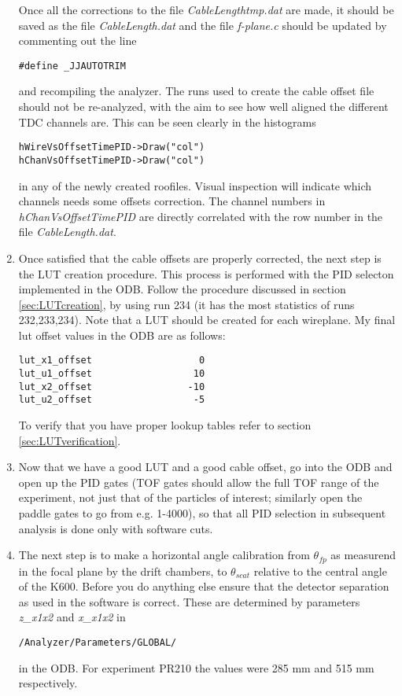 \documentclass[11pt]{report}
\begin{document}
\begin{enumerate}
Once all the corrections to the file {\it CableLengthtmp.dat}
are made, it should be saved as the file {\it CableLength.dat} and the file
{\it f-plane.c} should be updated by commenting out the line
\begin{verbatim} 
#define _JJAUTOTRIM
\end{verbatim}
and recompiling the analyzer. The runs used to create the cable offset file
should not be re-analyzed, with the aim to see how well aligned the different
TDC channels are. This can be seen clearly in the histograms
\begin{verbatim} 
hWireVsOffsetTimePID->Draw("col")
hChanVsOffsetTimePID->Draw("col")
\end{verbatim}
in any of the newly created roofiles. Visual inspection will indicate which channels
needs some offsets correction. The channel numbers in {\it hChanVsOffsetTimePID}
are directly correlated with the row number in the file  {\it CableLength.dat}.

\item 
Once satisfied that the cable offsets are properly corrected, the next
step is the LUT creation procedure. This process is performed with the
PID selecton implemented in the ODB. 
Follow the procedure discussed in section \ref{sec:LUTcreation},
by using run 234 (it has the most statistics of runs 232,233,234).
Note that a LUT should be created for each wireplane.
My final lut offset values in the ODB are as follows:
\begin{verbatim}
lut_x1_offset                   0
lut_u1_offset                  10
lut_x2_offset                 -10
lut_u2_offset                  -5
\end{verbatim}
To verify that you have proper lookup tables refer to section \ref{sec:LUTverification}.

\item 
Now that we have a good LUT and a good cable offset, go into the ODB and
open up the PID gates (TOF gates should allow the full TOF range of the experiment, not just that of 
the particles of interest; similarly open the paddle gates to go from e.g. 1-4000), 
so that all PID selection in subsequent analysis is done only with software cuts.

\item The next step is to make a horizontal angle calibration from $\theta_{fp}$
as measurend in the focal plane by the drift chambers, to $\theta_{scat}$ relative to
the central angle of the K600. 
%
Before you do anything else ensure that the detector separation as used in the
software is correct. These are determined by parameters {\it z\_x1x2} and {\it x\_x1x2} in 
\begin{verbatim}
/Analyzer/Parameters/GLOBAL/
\end{verbatim}
in the ODB. For experiment PR210 the values were 285 mm and 515 mm respectively.


\end{enumerate}
\end{document}
